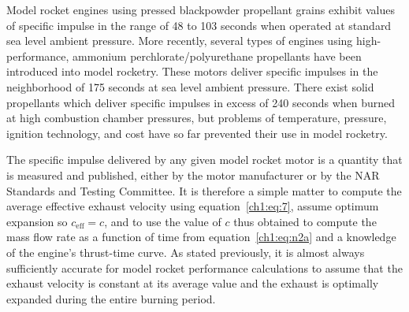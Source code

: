 Model rocket engines using pressed blackpowder propellant grains exhibit values of specific
impulse in the range of 48 to 103 seconds when operated at standard sea level ambient
pressure. More recently, several types of engines using high-performance, ammonium
perchlorate/polyurethane propellants have been introduced into model rocketry. These motors
deliver specific impulses in the neighborhood of 175 seconds at sea level ambient pressure. There
exist solid propellants which deliver specific impulses in excess of 240 seconds when burned at
high combustion chamber pressures, but problems of temperature, pressure, ignition technology,
and cost have so far prevented their use in model rocketry.

The specific impulse delivered by any given model rocket motor is a quantity that is measured
and published, either by the motor manufacturer or by the NAR Standards and Testing Committee.
It is therefore a simple matter to compute the average effective exhaust velocity using
equation~\eqref{ch1:eq:7}, assume optimum expansion so $c_{\mathrm{eff}} = c$, and to use the
value of $c$ thus obtained to compute the mass flow rate as a function of time from
equation~\eqref{ch1:eq:n2a} and a knowledge of the engine's thrust-time curve. As stated previously, it is almost always sufficiently
accurate for model rocket performance calculations to assume that the exhaust velocity is
constant at its average value and the exhaust is optimally expanded during the entire burning
period.
